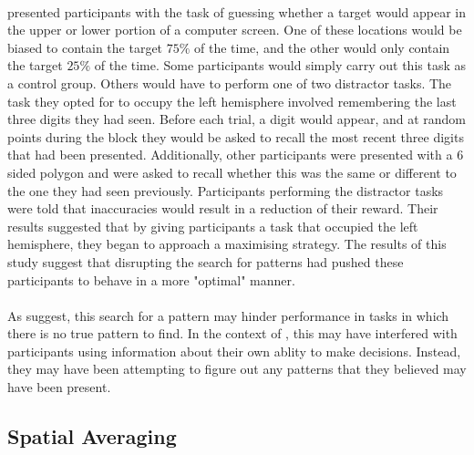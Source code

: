 \documentclass[12pt]{article}
\begin{document}
\paragraph{} \cite{wolford2004searching} presented participants with the task of guessing whether a target would appear in the upper or lower portion of a computer screen. One of these locations would be biased to contain the target $75\%$ of the time, and the other would only contain the target $25\%$ of the time. Some participants would simply carry out this task as a control group. Others would have to perform one of two distractor tasks. The task they opted for to occupy the left hemisphere involved remembering the last three digits they had seen. Before each trial, a digit would appear, and at random points during the block they would be asked to recall the most recent three digits that had been presented. Additionally, other participants were presented with a 6 sided polygon and were asked to recall whether this was the same or different to the one they had seen previously. Participants performing the distractor tasks were told that inaccuracies would result in a reduction of their reward. Their results suggested that by giving participants a task that occupied the left hemisphere, they began to approach a maximising strategy. The results of this study suggest that disrupting the search for patterns had pushed these participants to behave in a more "optimal" manner. 

\paragraph{} As \cite{wolford2004searching} suggest, this search for a pattern may hinder performance in tasks in which there is no true pattern to find. In the context of \cite{clarke2015failure}, this may have interfered with participants using information about their own ablity to make decisions. Instead, they may have been attempting to figure out any patterns that they believed may have been present. %


\subsection*{Spatial Averaging}
\end{document}
